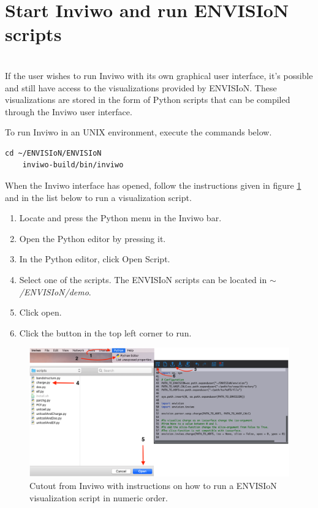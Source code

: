 \section{Start Inviwo and run ENVISIoN scripts}

\\
If the user wishes to run Inviwo with its own graphical user interface, it's possible and still have access to the visualizations provided by ENVISIoN. These visualizations are stored in the form of Python scripts that can be compiled through the Inviwo user interface.

To run Inviwo in an UNIX environment, execute the commands below.

\begin{lstlisting}[frame = single, breaklines=true]
    cd ~/ENVISIoN/ENVISIoN
    inviwo-build/bin/inviwo
\end{lstlisting}

When the Inviwo interface has opened, follow the instructions given in figure \ref{fig:Inviwo} and in the list below to run a visualization script.

\begin{enumerate}
\item Locate and press the Python menu in the Inviwo bar.
\item Open the Python editor by pressing it.
\item In the Python editor, click Open Script.
\item Select one of the scripts. The ENVISIoN scripts can be located in \emph{$\sim$/ENVISIoN/demo}.
\item Click open.
\item Click the button in the top left corner to run.
\end{enumerate}

\begin{figure}[ht]
    \centering
    \includegraphics[angle=0, width=\linewidth]{Images/completeInviwo.png}
    \caption{Cutout from Inviwo with instructions on how to run a ENVISIoN visualization script in numeric order.}
    \label{fig:Inviwo}
\end{figure}
